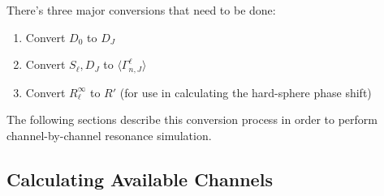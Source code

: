     There's three major conversions that need to be done:
    \begin{enumerate}
        \item Convert $D_0$ to $D_J$
        \item Convert $S_\ell, D_J$ to $\langle \Gamma_{n,J}^\ell \rangle$
        \item Convert $R_\ell^\infty$ to $R'$ (for use in calculating the hard-sphere phase shift)
    \end{enumerate}
    The following sections describe this conversion process in order to perform channel-by-channel resonance simulation.


    \subsection{Calculating Available Channels}
        \label{ssec:channels}
    
